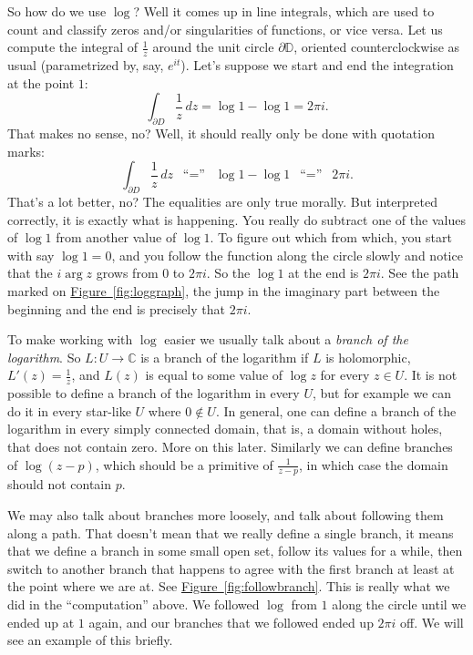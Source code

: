 \documentclass[12pt,openany]{book}
\newcommand{\C}{{\mathbb{C}}}
\newcommand{\D}{{\mathbb{D}}}
\newcommand{\myindex}[1]{#1\index{#1}}
\theoremstyle{plain}
\theoremstyle{remark}
\theoremstyle{definition}
\theoremstyle{exercise}
\theoremstyle{example}
\newcommand{\figureref}[1]{\hyperref[#1]{Figure~\ref*{#1}}}
\begin{document}
So how do we use $\log$?  Well it comes up in line integrals, which are used
to count and classify zeros and/or singularities of functions, or vice
versa.  Let us compute the integral of $\frac{1}{z}$ around the unit
circle $\partial \D$, oriented counterclockwise as usual (parametrized
by, say, $e^{it}$).  Let's suppose we start and end the integration at the
point $1$:
\begin{equation*}
\int_{\partial D} \frac{1}{z} \, dz
= \log 1 - \log 1 = 2\pi i.
\end{equation*}
That makes no sense, no?  Well, it should really only be done
with quotation marks:
\begin{equation*}
\int_{\partial D} \frac{1}{z} \, dz
\enspace
\text{``$=$''}
\enspace
\log 1 - \log 1
\enspace
\text{``$=$''}
\enspace
2\pi i.
\end{equation*}
That's a lot better, no?  The equalities are only true morally.  But
interpreted correctly, it is exactly what is happening.  You really do subtract
one of the values of $\log 1$ from another value of $\log 1$.  To figure
out which from which, you start with say $\log 1 = 0$, and you follow the
function along the circle slowly and notice that the $i \arg z$ grows from $0$ to
$2\pi i$.  So the $\log 1$ at the end is $2 \pi i$.  See the path
marked on \figureref{fig:loggraph}, the jump in the imaginary part between
the beginning and the end is precisely that $2\pi i$.

To make working with $\log$ easier we usually talk about a
\emph{\myindex{branch of the logarithm}}.  So $L \colon U \to \C$ is a branch
of the logarithm if $L$ is holomorphic, $L'(z) = \frac{1}{z}$, and $L(z)$ is equal
to some value of $\log z$ for every $z \in U$.  It is not possible to define
a branch of the logarithm in every $U$, but for example we can do it in every
star-like $U$ where $0 \notin U$.  In general, one can define a branch of
the logarithm in every simply connected domain, that is, a domain without holes,
that does not contain zero.
More on this later.  Similarly we can define branches of $\log (z-p)$, which
should be a primitive of $\frac{1}{z-p}$, in which case the domain
should not contain $p$.

We may also talk about branches more loosely, and talk
about following them along a path.  That doesn't mean that we really define
a single branch, it means that we define a branch in some small open set,
follow its values for a while, then switch to another branch that 
happens to agree with the first branch at least at the point where we are
at.  See \figureref{fig:followbranch}.  This is really what we did in the
``computation'' above.  We followed $\log$ from $1$ along the circle until we
ended up at $1$ again, and our branches that we followed ended up $2\pi i$
off.  We will see an example of this briefly.
\end{document}
